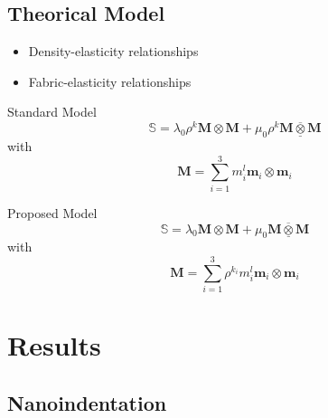 \documentclass[a4paper,fleqn]{DC_ArtStyle}
\begin{document}
	\subsection{Theorical Model}
	\begin{itemize}
		\item Density-elasticity relationships
		\item Fabric-elasticity relationships
	\end{itemize}

	Standard Model
	\begin{equation}
		\mathbb{S} = \lambda_0 \rho^k \mathbf{M} \otimes \mathbf{M} + \mu_0 \rho^k \mathbf{M} \underline{\overline{\otimes}}  \mathbf{M}
	\end{equation}
	with
	\begin{equation}
		\mathbf{M} = \sum_{i=1}^{3} m_i^l \mathbf{m}_i \otimes \mathbf{m}_i
	\end{equation}

	Proposed Model
	\begin{equation}
		\mathbb{S} = \lambda_0 \mathbf{M} \otimes \mathbf{M} + \mu_0 \mathbf{M} \underline{\overline{\otimes}} \mathbf{M}
	\end{equation}
	with
	\begin{equation}
		\mathbf{M} = \sum_{i=1}^{3} \rho^{k_i} m_i^l \mathbf{m}_i \otimes \mathbf{m}_i
	\end{equation}
	

	\clearpage
	\section{Results}
	\subsection{Nanoindentation}
	\begin{table}
		\caption{Nanoindentation - cortical bone matrix properties}
	\end{table}
\end{document}
